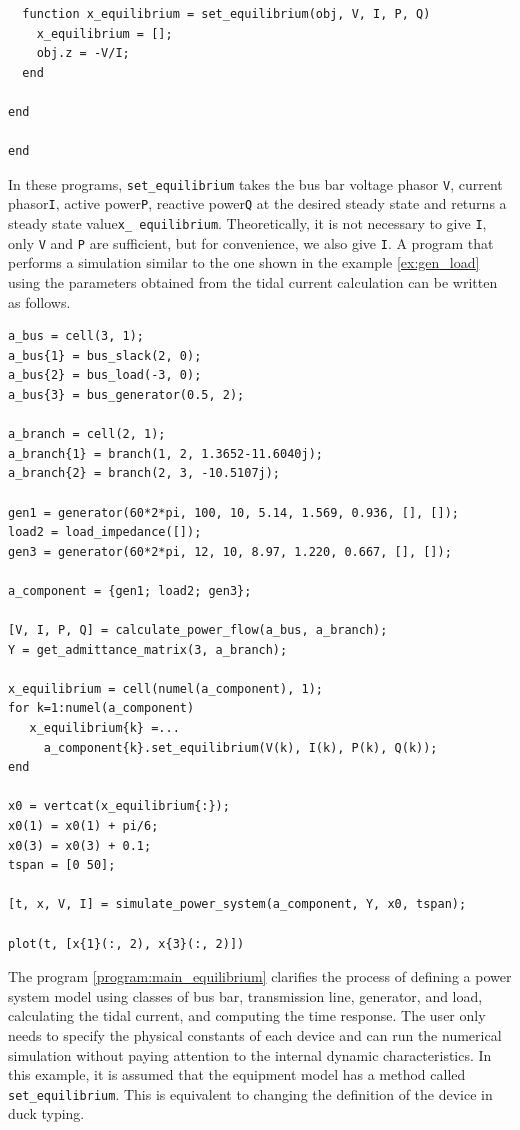 \documentclass[graybox, envcountchap]{svmult}
\begin{document}
\begin{example}
\begin{PROGRAMA}[count,title={load\_impedance.m}]
\begin{verbatim}
  function x_equilibrium = set_equilibrium(obj, V, I, P, Q)
    x_equilibrium = [];
    obj.z = -V/I;
  end

end

end
\end{verbatim}
\end{PROGRAMA}
In these programs, \verb|set_equilibrium| takes the bus bar voltage phasor \verb|V|, current phasor\verb|I|, active power\verb|P|, reactive power\verb|Q| at the desired steady state and returns a steady state value\verb|x_ equilibrium|.
Theoretically, it is not necessary to give \verb|I|, only \verb|V| and \verb|P| are sufficient, but for convenience, we also give \verb|I|.
A program that performs a simulation similar to the one shown in the example \ref{ex:gen_load} using the parameters obtained from the tidal current calculation can be written as follows.

\smallskip
\begin{PROGRAMA}[count,title={main\_simulation\_3bus\_equilibrium.m}]\label{program:main_equilibrium}
\begin{verbatim}
a_bus = cell(3, 1);
a_bus{1} = bus_slack(2, 0);
a_bus{2} = bus_load(-3, 0);
a_bus{3} = bus_generator(0.5, 2);

a_branch = cell(2, 1);
a_branch{1} = branch(1, 2, 1.3652-11.6040j);
a_branch{2} = branch(2, 3, -10.5107j);

gen1 = generator(60*2*pi, 100, 10, 5.14, 1.569, 0.936, [], []);
load2 = load_impedance([]);
gen3 = generator(60*2*pi, 12, 10, 8.97, 1.220, 0.667, [], []);

a_component = {gen1; load2; gen3};

[V, I, P, Q] = calculate_power_flow(a_bus, a_branch);
Y = get_admittance_matrix(3, a_branch);

x_equilibrium = cell(numel(a_component), 1);
for k=1:numel(a_component)
   x_equilibrium{k} =...
     a_component{k}.set_equilibrium(V(k), I(k), P(k), Q(k)); 
end

x0 = vertcat(x_equilibrium{:});
x0(1) = x0(1) + pi/6;
x0(3) = x0(3) + 0.1;
tspan = [0 50];

[t, x, V, I] = simulate_power_system(a_component, Y, x0, tspan);

plot(t, [x{1}(:, 2), x{3}(:, 2)])
\end{verbatim}
\end{PROGRAMA}

The program \ref{program:main_equilibrium} clarifies the process of defining a power system model using classes of bus bar, transmission line, generator, and load, calculating the tidal current, and computing the time response.
The user only needs to specify the physical constants of each device and can run the numerical simulation without paying attention to the internal dynamic characteristics.
In this example, it is assumed that the equipment model has a method called {\verb|set_equilibrium|}.
This is equivalent to changing the definition of the device in duck typing.
\end{example}
\end{document}

